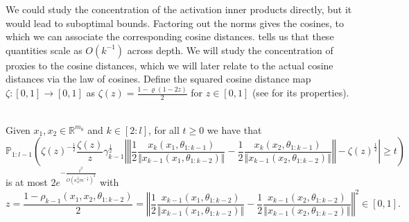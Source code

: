 \documentclass[twoside,11pt]{article}
\newcommand{\R}{\mathbb{R}}
\newcommand{\Prob}{\mathbb{P}}
\begin{document}
We could study the concentration of the activation inner products directly, but it would lead to suboptimal bounds. Factoring out the norms gives the cosines, to which we can associate the corresponding cosine distances. \citet[Proposition~13]{mlpsateoc1} tells us that these quantities scale as $O(k^{-1})$ across depth. We will study the concentration of proxies to the cosine distances, which we will later relate to the actual cosine distances via the law of cosines. Define the squared cosine distance map $\zeta : [0,1] \to [0,1]$ as $\zeta(z) = \frac{1-\varrho(1 - 2z)}{2}$ for $z \in [0,1]$ (see \citet[Proposition~11]{mlpsateoc1} for its properties).

\begin{proposition}\label{prop:cosine_distance_concentration}~\\
Given $x_1, x_2 \in \R^{m_0}$ and $k \in [2:l]$, for all $t \geq 0$ we have that
\[
\Prob_{1:l-1}\left( \zeta(z)^{-\frac{1}{2}} \frac{\zeta(z)}{z} \gamma_{k-1}^{\frac{1}{2}} \left\vert \left\Vert \frac{1}{2} \frac{x_k(x_1, \theta_{1 : k-1})}{\Vert x_{k-1}(x_1, \theta_{1 : k-2}) \Vert} - \frac{1}{2} \frac{x_k(x_2, \theta_{1 : k-1})}{\Vert x_{k-1}(x_2, \theta_{1 : k-2}) \Vert} \right\Vert - \zeta(z)^{\frac{1}{2}} \right\vert \geq t \right)
\]
is at most $2e^{-\frac{t^2}{O\left( \kappa_\phi^2 m^{-\frac{1}{2}} \right)^2}}$ with
\[
z = \frac{1 - \rho_{k-1}(x_1,x_2,\theta_{1:k-2})}{2} = \left\Vert \frac{1}{2} \frac{x_{k-1}(x_1, \theta_{1 : k-2})}{\Vert x_{k-1}(x_1, \theta_{1 : k-2}) \Vert} - \frac{1}{2} \frac{x_{k-1}(x_2, \theta_{1 : k-2})}{\Vert x_{k-1}(x_2, \theta_{1 : k-2}) \Vert} \right\Vert^2 \in [0,1].
\]
\end{proposition}
\end{document}
